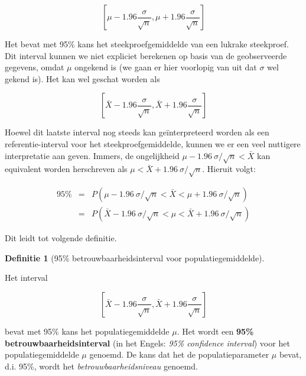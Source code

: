 \documentclass[
  12pt,dutch,coursenotes]{book}
\theoremstyle{definition}
\newtheorem{definition}{Definitie}[chapter]
\theoremstyle{definition}
\theoremstyle{definition}
\theoremstyle{remark}
\begin{document}
\begin{equation*}
\left[\mu - 1.96 \frac{\sigma}{\sqrt{n}},\mu + 1.96 \frac{\sigma}{\sqrt{n}}%
\right]
\end{equation*}

Het bevat met 95\% kans het steekproefgemiddelde van een lukrake
steekproef. Dit interval kunnen we niet expliciet berekenen op basis van de
geobserveerde gegevens, omdat \(\mu\) ongekend is (we gaan er hier voorlopig
van uit dat \(\sigma\) wel gekend is). Het kan wel geschat worden als

\begin{equation*}
\left[\bar X - 1.96 \frac{\sigma}{\sqrt{n}},\bar X + 1.96 \frac{\sigma}{\sqrt{n}}\right]
\end{equation*}

Hoewel dit laatste interval nog steeds kan geïnterpreteerd worden als
een referentie-interval voor het steekproefgemiddelde, kunnen we er een veel
nuttigere interpretatie aan geven. Immers, de ongelijkheid \(\mu - 1.96 \
\sigma/\sqrt{n} < \bar{X}\) kan equivalent worden herschreven als \(\mu < \bar{X} + 1.96 \ \sigma/\sqrt{n}\). Hieruit volgt:

\begin{eqnarray*}
95\% &=& P( \mu - 1.96 \ \sigma/\sqrt{n} < \bar{X} < \mu + 1.96 \ \sigma/\sqrt{n} ) \\
&=&P( \bar{X} - 1.96 \ \sigma/\sqrt{n} < \mu < \bar{X} + 1.96 \ \sigma/\sqrt{n} )
\end{eqnarray*}

Dit leidt tot volgende definitie.

\begin{definition}[95\% betrouwbaarheidsinterval voor populatiegemiddelde]
\protect\hypertarget{def:unnamed-chunk-144}{}{\label{def:unnamed-chunk-144} \iffalse (95\% betrouwbaarheidsinterval voor populatiegemiddelde) \fi{} }
\end{definition}
Het interval

\begin{equation}
\left[\bar X - 1.96 \frac{\sigma}{\sqrt{n}},\bar X + 1.96 \frac{\sigma}{\sqrt{n}}\right] \label{eq:bi}
\end{equation}

bevat met 95\% kans het populatiegemiddelde \(\mu\). Het wordt een \textbf{95\% betrouwbaarheidsinterval} (in het Engels: \emph{95\% confidence interval}) voor het populatiegemiddelde \(\mu\) genoemd. De kans dat het de populatieparameter \(\mu\)
bevat, d.i. 95\%, wordt het \emph{betrouwbaarheidsniveau} genoemd.
\end{document}
